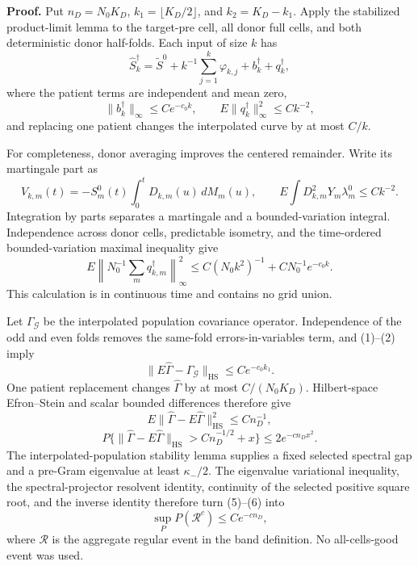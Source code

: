 \textbf{Proof.}
Put \(n_D=N_0K_D\), \(k_1=\lfloor K_D/2\rfloor\), and \(k_2=K_D-k_1\). Apply the stabilized product-limit lemma to the target-pre cell, all donor full cells, and both deterministic donor half-folds. Each input of size \(k\) has
\[
 \widehat S_k^\dagger=\widetilde S^0+k^{-1}\sum_{j=1}^k\varphi_{k,j}
 +b_k^\dagger+q_k^\dagger,                               \tag{1}
\]
where the patient terms are independent and mean zero,
\[
 \|b_k^\dagger\|_\infty\le Ce^{-c_0k},\qquad
 E\|q_k^\dagger\|_\infty^2\le Ck^{-2},                  \tag{2}
\]
and replacing one patient changes the interpolated curve by at most \(C/k\).

For completeness, donor averaging improves the centered remainder. Write its martingale part as
\[
 V_{k,m}(t)=-S_m^0(t)\int_0^tD_{k,m}(u)\,dM_m(u),\qquad
 E\int D_{k,m}^2Y_m\lambda_m^0\le Ck^{-2}.               \tag{3}
\]
Integration by parts separates a martingale and a bounded-variation integral. Independence across donor cells, predictable isometry, and the time-ordered bounded-variation maximal inequality give
\[
 E\left\|N_0^{-1}\sum_mq_{k,m}^\dagger\right\|_\infty^2
 \le C(N_0k^2)^{-1}+CN_0^{-1}e^{-c_0k}.                  \tag{4}
\]
This calculation is in continuous time and contains no grid union.

Let \(\Gamma_{\mathcal G}\) be the interpolated population covariance operator. Independence of the odd and even folds removes the same-fold errors-in-variables term, and (1)--(2) imply
\[
 \|E\widehat\Gamma-\Gamma_{\mathcal G}\|_{\mathrm{HS}}
 \le Ce^{-c_0k_1}.                                       \tag{5}
\]
One patient replacement changes \(\widehat\Gamma\) by at most \(C/(N_0K_D)\). Hilbert-space Efron--Stein and scalar bounded differences therefore give
\[
 E\|\widehat\Gamma-E\widehat\Gamma\|_{\mathrm{HS}}^2\le Cn_D^{-1},
\]
\[
 P\{\|\widehat\Gamma-E\widehat\Gamma\|_{\mathrm{HS}}
 >Cn_D^{-1/2}+x\}\le2e^{-cn_Dx^2}.                       \tag{6}
\]
The interpolated-population stability lemma supplies a fixed selected spectral gap and a pre-Gram eigenvalue at least \(\kappa_-/2\). The eigenvalue variational inequality, the spectral-projector resolvent identity, continuity of the selected positive square root, and the inverse identity therefore turn (5)--(6) into
\[
 \sup_PP(\mathcal R^c)\le Ce^{-cn_D},                    \tag{7}
\]
where \(\mathcal R\) is the aggregate regular event in the band definition. No all-cells-good event was used.

